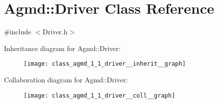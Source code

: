 \hypertarget{class_agmd_1_1_driver}{\section{Agmd\+:\+:Driver Class Reference}
\label{class_agmd_1_1_driver}
}


{\ttfamily \#include $<$Driver.\+h$>$}



Inheritance diagram for Agmd\+:\+:Driver\+:\nopagebreak
\begin{figure}[H]
\begin{center}
\leavevmode
\texttt{[image: class\_agmd\_1\_1\_driver\_\_inherit\_\_graph]}
\end{center}
\end{figure}


Collaboration diagram for Agmd\+:\+:Driver\+:\nopagebreak
\begin{figure}[H]
\begin{center}
\leavevmode
\texttt{[image: class\_agmd\_1\_1\_driver\_\_coll\_\_graph]}
\end{center}
\end{figure}
